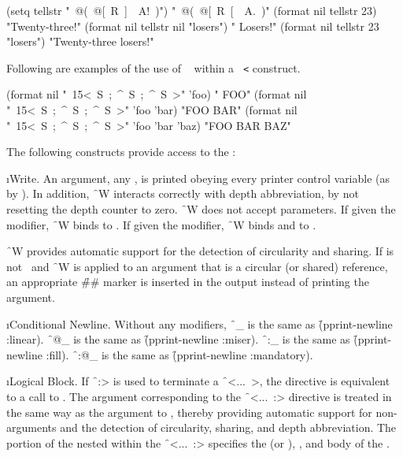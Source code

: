 \code
 (setq tellstr "~@(~@[~R~]~\hat  ~A!~)")
\EV "~@(~@[~R~[~\hat ~A.~)"
 (format nil tellstr 23) \EV "Twenty-three!"
 (format nil tellstr nil "losers") \EV " Losers!"
 (format nil tellstr 23 "losers") \EV "Twenty-three losers!"
\endcode

Following are examples of the use of {\tt ~\hat } 
within a {\tt ~<} construct.

\code
 (format nil "~15<~S~;~\^~S~;~\^~S~>" 'foo)
\EV  "            FOO"
 (format nil "~15<~S~;~\^~S~;~\^~S~>" 'foo 'bar)
\EV  "FOO         BAR"
 (format nil "~15<~S~;~\^~S~;~\^~S~>" 'foo 'bar 'baz)
\EV  "FOO   BAR   BAZ"
\endcode

\endlist


The following constructs provide access to the :

\beginlist


\i{Write}.
An argument, any , is printed obeying every printer control
variable (as by ).  In addition, \f{~W} interacts correctly with depth
abbreviation, by not resetting the depth counter to zero.  \f{~W} does not
accept parameters.  If given the  modifier, \f{~W} binds 
to .  If given the  modifier, \f{~W} binds 
and  to \nil.
 
\f{~W} provides automatic support for the detection of circularity and
sharing.  If  is not \nil\ and \f{~W} is applied
to an argument that is a circular (or shared) reference, an appropriate 
\f{\#\#} marker is inserted in the output instead of printing the argument.
 
\itemitem{\f{~_}}

\i{Conditional Newline}.
Without any modifiers, \f{~_} is the same as \f{(pprint-newline :linear)}.
\f{~@_}  is the same as \f{(pprint-newline :miser)}.
\f{~:_}  is the same as \f{(pprint-newline :fill)}.
\f{~:@_} is the same as \f{(pprint-newline :mandatory)}.


\i{Logical Block}.
If \f{~:>} is used to terminate a \f{~<...~>},
the directive is equivalent to a call to .
The argument corresponding to the \f{~<...~:>} directive is treated in
the same way as the  argument to ,
thereby providing automatic support for non- arguments and
the detection of circularity, sharing, and depth abbreviation.  
The portion of the  nested within the \f{~<...~:>}
specifies the  (or ), ,
and body of the .
 

